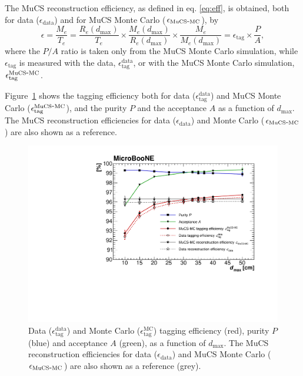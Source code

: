 \documentclass[a4paper,11pt]{article}
\def\myhyphen{{\hbox{-}}}
\begin{document}
The MuCS reconstruction efficiency, as defined in eq. \eqref{eq:eff}, is obtained, both for data ($\epsilon_{\mathrm{data}}$) and for MuCS Monte Carlo ($\epsilon_{\mathrm{MuCS\myhyphen MC}}$), by
\begin{equation}\label{eq:mceff}
  \epsilon = \frac{M_{e}}{T_{e}} = \frac{R_{e}(d_{\mathrm{max}})}{T_{e}} \times \frac{M_{e}(d_{\mathrm{max}})}{R_{e}(d_{\mathrm{max}})} \times \frac{M_{e}}{M_{e}(d_{\mathrm{max}})} = \epsilon_{\mathrm{tag}} \times \frac{P}{A},
\end{equation}
where the $P/A$ ratio is taken only from the MuCS Monte Carlo simulation, while $\epsilon_{\mathrm{tag}}$ is measured with the data, $\epsilon^{\mathrm{data}}_{\mathrm{tag}}$, or with the MuCS Monte Carlo simulation, $\epsilon^{\mathrm{MuCS\myhyphen MC}}_{\mathrm{tag}}$.

Figure~\ref{fig:purity} shows the tagging efficiency both for data ($\epsilon^{\mathrm{data}}_{\mathrm{tag}}$) and MuCS Monte Carlo  ($\epsilon^{\mathrm{MuCS\myhyphen MC}}_{\mathrm{tag}}$), and the purity $P$ and the acceptance $A$ as a function of $d_{\mathrm{max}}$. The MuCS reconstruction efficiencies for data ($\epsilon_{\mathrm{data}}$) and Monte Carlo ($\epsilon_{\mathrm{MuCS\myhyphen MC}}$) are also shown as a reference.

\begin{figure}[htbp]
  \begin{center}
    \includegraphics[width=0.7\linewidth]{figures/purity.pdf}
    \caption{Data ($\epsilon^{\mathrm{data}}_{\mathrm{tag}}$) and Monte Carlo ($\epsilon^{\mathrm{MC}}_{\mathrm{tag}}$) tagging efficiency (red), purity $P$ (blue) and acceptance $A$ (green), as a function of $d_{\mathrm{max}}$. The MuCS reconstruction efficiencies for data ($\epsilon_{\mathrm{data}}$) and MuCS Monte Carlo ($\epsilon_{\mathrm{MuCS\myhyphen MC}}$) are also shown as a reference (grey).} \label{fig:purity}
  \end{center}
\end{figure}
\end{document}
